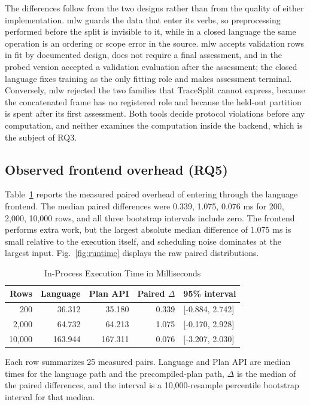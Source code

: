 \documentclass[lettersize,journal]{IEEEtran}
\newcommand{\tool}{TraceSplit}
\begin{document}
The differences follow from the two designs rather than from the quality of either implementation. mlw guards the data that enter its verbs, so preprocessing performed before the split is invisible to it, while in a closed language the same operation is an ordering or scope error in the source. mlw accepts validation rows in fit by documented design, does not require a final assessment, and in the probed version accepted a validation evaluation after the assessment; the closed language fixes training as the only fitting role and makes assessment terminal. Conversely, mlw rejected the two families that \tool{} cannot express, because the concatenated frame has no registered role and because the held-out partition is spent after its first assessment. Both tools decide protocol violations before any computation, and neither examines the computation inside the backend, which is the subject of RQ3.

\subsection{Observed frontend overhead (RQ5)}
Table~\ref{tab:runtime} reports the measured paired overhead of entering through the language frontend. The median paired differences were 0.339, 1.075, 0.076 ms for 200, 2,000, 10,000 rows, and all three bootstrap intervals include zero. The frontend performs extra work, but the largest absolute median difference of 1.075 ms is small relative to the execution itself, and scheduling noise dominates at the largest input. Fig.~\ref{fig:runtime} displays the raw paired distributions.

\begin{table}[t]
\caption{In-Process Execution Time in Milliseconds}
\label{tab:runtime}\centering\footnotesize
\begin{tabular}{rrrrl}\toprule
Rows & Language & Plan API & Paired $\Delta$ & 95\% interval\\\midrule
200 & 36.312 & 35.180 & 0.339 & [-0.884, 2.742]\\
2,000 & 64.732 & 64.213 & 1.075 & [-0.170, 2.928]\\
10,000 & 163.944 & 167.311 & 0.076 & [-3.207, 2.030]\\
\bottomrule
\end{tabular}

\smallskip
\parbox{0.95\columnwidth}{\footnotesize Each row summarizes 25 measured pairs. Language and Plan API are median times for the language path and the precompiled-plan path, $\Delta$ is the median of the paired differences, and the interval is a 10,000-resample percentile bootstrap interval for that median.}
\end{table}
\end{document}
